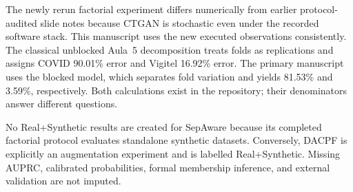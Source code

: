 The newly rerun factorial experiment differs numerically from earlier protocol-audited slide notes because CTGAN is stochastic even under the recorded software stack. This manuscript uses the new executed observations consistently. The classical unblocked Aula~5 decomposition treats folds as replications and assigns COVID 90.01\% error and Vigitel 16.92\% error. The primary manuscript uses the blocked model, which separates fold variation and yields 81.53\% and 3.59\%, respectively. Both calculations exist in the repository; their denominators answer different questions.

No Real+Synthetic results are created for SepAware because its completed factorial protocol evaluates standalone synthetic datasets. Conversely, DACPF is explicitly an augmentation experiment and is labelled Real+Synthetic. Missing AUPRC, calibrated probabilities, formal membership inference, and external validation are not imputed.
